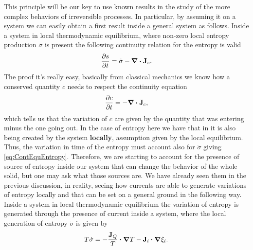 This principle will be our key to use known results in the study of the more complex behaviors of irreversible processes. In particular, by assuming it on a system we can easily obtain a first result inside a general system as follows.
{
    Inside a system in local thermodynamic equilibrium, where non-zero local entropy production $\dot{\sigma}$ is present the following continuity relation for the entropy is valid
    \begin{equation}
        \label{eq:ContEquEntropy}
        \pdv{s}{t} = \dot{\sigma} - \grad\vdot\vb{J}_s.
    \end{equation}
}
{
    The proof it's really easy, basically from classical mechanics we know how a conserved quantity $c$ needs to respect the continuity equation
    \begin{equation}
        \pdv{c}{t} = - \grad\vdot\vb{J}_c,
    \end{equation}
    which tells us that the variation of $c$ are given by the quantity that was entering minus the one going out. In the case of entropy here we have that in it is also being created by the system \textbf{locally}, assumption given by the local equilibrium. Thus, the variation in time of the entropy must account also for $\dot{\sigma}$ giving \eqref{eq:ContEquEntropy}.
}
\noindent
Therefore, we are starting to account for the presence of source of entropy inside our system that can change the behavior of the whole solid, but one may ask what those sources are. We have already seen them in the previous discussion, in reality, seeing how currents are able to generate variations of entropy locally and that can be set on a general ground in the following way.
{
    Inside a system in local thermodynamic equilibrium the variation of entropy is generated through the presence of current inside a system, where the local generation of entropy $\dot{\sigma}$ is given by
    \begin{equation}
        \label{eq:EntroProduct}
        T\dot{\sigma} = -\frac{\vb{J}_Q}{T}\vdot\grad T - \vb{J}_i\vdot\grad\xi_i.
    \end{equation}
}
